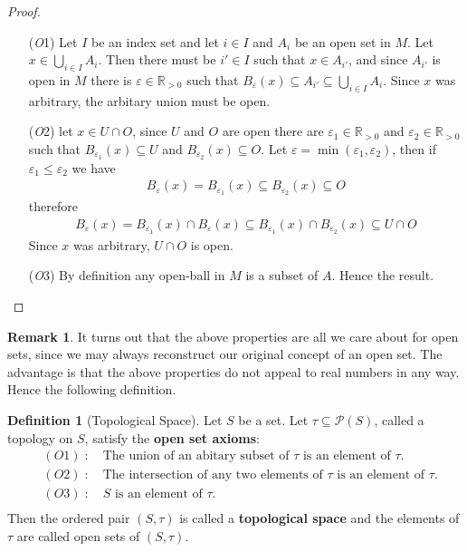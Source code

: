 \documentclass{article}
\theoremstyle{plain}
\theoremstyle{definition}
\newtheorem*{remark}{Remark}
\newtheorem{definition}[theorem]{Definition}
\newcommand{\R}{\mathbb{R}}
\begin{document}
\begin{proof}$\ $\newline
\begin{itemize}
	\item[(\textit{O}1)] Let $I$ be an index set and let $i\in I$ and $A_i$ be
		an open set in $M$. Let $x\in \bigcup_{i\in I} A_i$. Then there must be
		$i'\in I$ such that $x\in A_{i'}$, and since $A_{i'}$ is open in $M$
		there is $\varepsilon\in\R_{>0}$ such that $B_{\varepsilon}(x)\subseteq
		A_{i'}\subseteq \bigcup_{i\in I} A_i$. Since $x$ was arbitrary, the
		arbitary union must be open.
	\item[(\textit{O}2)] let $x\in U\cap O$, since $U$ and $O$ are open there
		are $\varepsilon_1\in\R_{>0}$ and $\varepsilon_2\in\R_{>0}$ such that 
		$B_{\varepsilon_1}(x)\subseteq U$ and $B_{\varepsilon_2}(x)\subseteq O$.
		Let $\varepsilon = \min(\varepsilon_1,\varepsilon_2)$, then if
		$\varepsilon_1\leq\varepsilon_2$ we have
	\begin{equation}
	\begin{aligned}
		B_{\varepsilon}(x)= B_{\varepsilon_1}(x)
		\subseteq B_{\varepsilon_2}(x)\subseteq O
	\end{aligned}
	\end{equation}
		therefore
	\begin{equation}
	\begin{aligned}
		B_{\varepsilon}(x) = B_{\varepsilon_1}(x) \cap B_{\varepsilon}(x)
		\subseteq B_{\varepsilon_1}(x) \cap B_{\varepsilon_2}(x)
		\subseteq U \cap O 
	\end{aligned}
	\end{equation}
		Since $x$ was arbitrary, $U\cap O$ is open.
	\item[(\textit{O}3)] By definition any open-ball in $M$ is a subset of $A$.
		Hence the result.
\end{itemize}
\end{proof}
\begin{remark}
	It turns out that the above properties are all we care about for open sets,
	since we may always reconstruct our original concept of an open set. The
	advantage is that the above properties do not appeal to real numbers in any
	way. Hence the following definition.
\end{remark}
\begin{definition}[Topological Space]
	Let $S$ be a set. Let $\tau \subseteq \mathcal{P}(S)$, called a topology on
	$S$, satisfy the
	\textbf{open set axioms}:
	\begin{equation}
	\begin{aligned}
		&(O1)\; :\quad \text{The union of an abitary subset of $\tau$ is an
				 element of $\tau$.}\\
		&(O2)\; :\quad \text{The intersection of any two elements of $\tau$ is
				 an element of $\tau$.}\\
		&(O3)\; :\quad \text{$S$ is an element of $\tau$.}\\
	\end{aligned}
	\end{equation}
	Then the ordered pair $(S,\tau)$ is called a \textbf{topological space} and
	the elements of $\tau$ are called open sets of $(S,\tau)$.
\end{definition}
\end{document}
